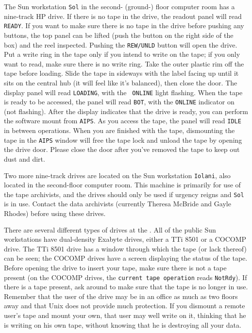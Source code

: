    The Sun workstation {\tt Sol} in the second- (ground-) floor
computer room has a nine-track HP drive. If there is no tape in the
drive, the readout panel will read \hbox{{\tt READY}}.  If you want to
make sure there is no tape in the drive before pushing any buttons,
the top panel can be lifted (push the button on the right side of the
box) and the reel inspected.  Pushing the {\tt REW/UNLD} button will
open the drive.  Put a write ring in the tape only if you intend to
write on the tape; if you only want to read, make sure there is no
write ring.  Take the outer plastic rim off the tape before loading.
Slide the tape in sideways with the label facing up until it sits on
the central hub (it will feel like it's balanced), then close the
door.  The display panel will read {\tt LOADING}, with the {\tt
ONLINE} light flashing.  When the tape is ready to be accessed, the
panel will read {\tt BOT}, with the {\tt ONLINE} indicator on (not
flashing).  After the display indicates that the drive is ready, you
can perform the software mount from \hbox{{\tt AIPS}}.  As you access
the tape, the panel will read {\tt IDLE} in between operations.  When
you are finished with the tape, dismounting the tape in the {\tt AIPS}
window will free the tape lock and unload the tape by opening the
drive door.  Please close the door after you've removed the tape to
keep out dust and dirt.

     Two more nine-track drives are located on the Sun workstation
{\tt Iolani}, also located in the second-floor computer room.  This
machine is primarily for use of the tape archivists, and the drives
should only be used if urgency reigns and {\tt Sol} is in use.
Contact the data archivists (currently Theresa McBride and Gayle
Rhodes) before using these drives.


     There are several different types of  drives
at the  \hbox{}.  All of the public Sun workstations have
dual-density Exabyte drives, either a TTi 8501 or a COCOMP drive.  The
TTi 8501 drive has a window through which the tape (or lack thereof)
can be seen; the COCOMP drives have a screen displaying the status of
the tape.  Before opening the drive to insert your tape, make sure
there is not a tape present (on the COCOMP drives, the {\tt current
tape operation} reads {\tt NotRdy}).  If there is a tape present, ask
around to make sure that the tape is no longer in use.  Remember that
the user of the drive may be in an office as much as two floors away
and that Unix does not provide much protection.  If you dismount a
remote user's tape and mount your own, that user may well write on it,
thinking that he is writing on his own tape, without knowing that he
is destroying all your data.

